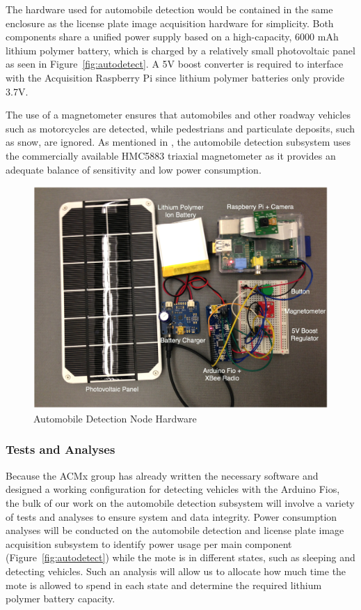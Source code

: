 \documentclass[11pt, oneside, fullpage, doublespace]{article}
\begin{document}
The hardware used for automobile detection would be contained in the same enclosure as the license plate image acquisition hardware for simplicity. Both components share a unified power supply based on a high-capacity, 6000 mAh lithium polymer battery, which is charged by a relatively small photovoltaic panel as seen in Figure~\ref{fig:autodetect}. A 5V boost converter is required to interface with the Acquisition Raspberry Pi since lithium polymer batteries only provide 3.7V.

The use of a magnetometer ensures that automobiles and other roadway vehicles such as motorcycles are detected, while pedestrians and particulate deposits, such as snow, are ignored. As mentioned in \cite{stillwell2013}, the automobile detection subsystem uses the commercially available HMC5883 triaxial magnetometer as it provides an adequate balance of sensitivity and low power consumption.

\begin{figure}
\begin{center}
\includegraphics[width=4.5in]{sensornode}
\end{center}
\caption{Automobile Detection Node Hardware}
\label{fig:autodetecthardware}
\end{figure}

\subsubsection{Tests and Analyses}
Because the ACMx group has already written the necessary software and designed a working configuration for detecting vehicles with the Arduino Fios, the bulk of our work on the automobile detection subsystem will involve a variety of tests and analyses to ensure system and data integrity. Power consumption analyses will be conducted on the automobile detection and license plate image acquisition subsystem to identify power usage per main component (Figure~\ref{fig:autodetect}) while the mote is in different states, such as sleeping and detecting vehicles. Such an analysis will allow us to allocate how much time the mote is allowed to spend in each state and determine the required lithium polymer battery capacity.
\end{document}
